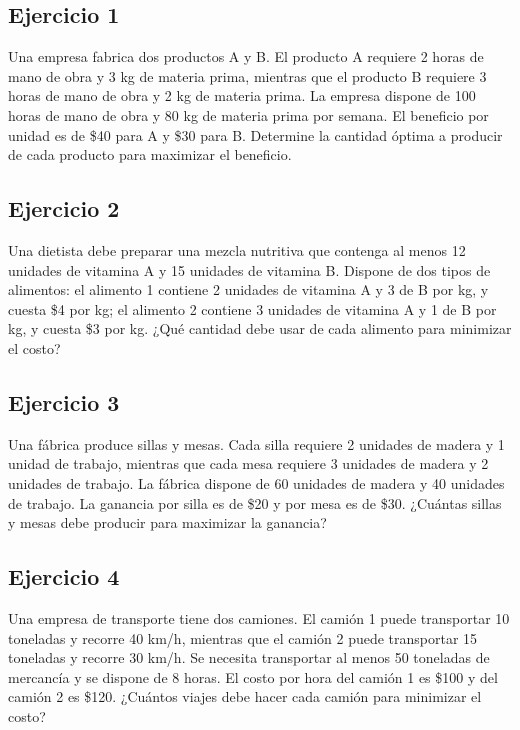 \documentclass[12pt]{article}
\begin{document}
\subsection{Ejercicio 1}

Una empresa fabrica dos productos A y B. El producto A requiere 2 horas de mano de obra y 3 kg de materia prima, mientras que el producto B requiere 3 horas de mano de obra y 2 kg de materia prima. La empresa dispone de 100 horas de mano de obra y 80 kg de materia prima por semana. El beneficio por unidad es de \$40 para A y \$30 para B. Determine la cantidad óptima a producir de cada producto para maximizar el beneficio.

\subsection{Ejercicio 2}

Una dietista debe preparar una mezcla nutritiva que contenga al menos 12 unidades de vitamina A y 15 unidades de vitamina B. Dispone de dos tipos de alimentos: el alimento 1 contiene 2 unidades de vitamina A y 3 de B por kg, y cuesta \$4 por kg; el alimento 2 contiene 3 unidades de vitamina A y 1 de B por kg, y cuesta \$3 por kg. ¿Qué cantidad debe usar de cada alimento para minimizar el costo?

\subsection{Ejercicio 3}

Una fábrica produce sillas y mesas. Cada silla requiere 2 unidades de madera y 1 unidad de trabajo, mientras que cada mesa requiere 3 unidades de madera y 2 unidades de trabajo. La fábrica dispone de 60 unidades de madera y 40 unidades de trabajo. La ganancia por silla es de \$20 y por mesa es de \$30. ¿Cuántas sillas y mesas debe producir para maximizar la ganancia?

\subsection{Ejercicio 4}

Una empresa de transporte tiene dos camiones. El camión 1 puede transportar 10 toneladas y recorre 40 km/h, mientras que el camión 2 puede transportar 15 toneladas y recorre 30 km/h. Se necesita transportar al menos 50 toneladas de mercancía y se dispone de 8 horas. El costo por hora del camión 1 es \$100 y del camión 2 es \$120. ¿Cuántos viajes debe hacer cada camión para minimizar el costo?
\end{document}
